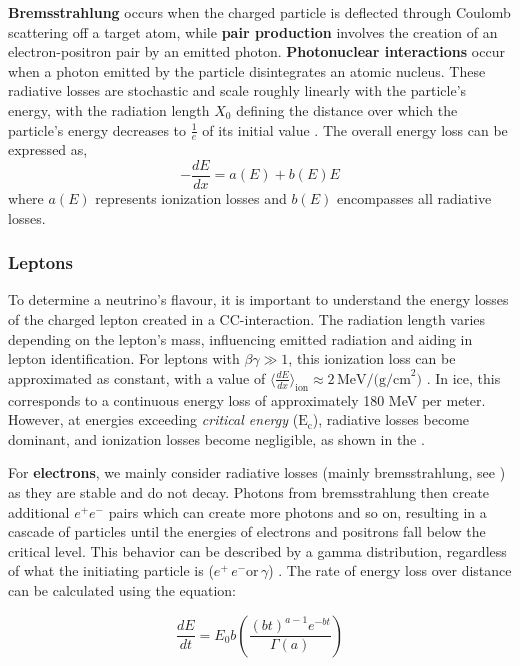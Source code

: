 \textbf{Bremsstrahlung} occurs when the charged particle is deflected through Coulomb scattering off a target atom, while \textbf{pair production} involves the creation of an electron-positron pair by an emitted photon. \textbf{Photonuclear interactions} occur when a photon emitted by the particle disintegrates an atomic nucleus. These radiative losses are stochastic and scale roughly linearly with the particle's energy, with the radiation length $ X_0 $ defining the distance over which the particle’s energy decreases to $ \frac{1}{e} $ of its initial value \cite{PDG_2024}. The overall energy loss can be expressed as, 
\begin{equation}\label{eq:1}
    -\frac{dE}{dx} = a(E) + b(E)E 
\end{equation}
where $a(E)$ represents ionization losses and $b(E)$ encompasses all radiative losses.

\subsubsection{Leptons}
\label{sec:leptons_inice}
To determine a neutrino's flavour, it is important to understand the energy losses of the charged lepton created in a CC-interaction. The radiation length varies depending on the lepton's mass, influencing emitted radiation and aiding in lepton identification. For leptons with $ \beta\gamma \gg 1 $, this ionization loss can be approximated as constant, with a value of $\langle \frac{dE}{dx} \rangle_{\text{ion}} \approx 2 \, \text{MeV/(g/cm}^2)$ . In ice, this corresponds to a continuous energy loss of approximately 180 MeV per meter. However, at energies exceeding \emph{critical energy} ($\mathrm{E}_\mathrm{c}$), radiative losses become dominant, and ionization losses become negligible, as shown in the  . 

For \textbf{electrons}, we mainly consider radiative losses (mainly bremsstrahlung, see ) as they are stable and do not decay. Photons from bremsstrahlung then create additional $e^+e^-$ pairs which can create more photons and so on, resulting in a cascade of particles until the energies of electrons and positrons fall below the critical level. This behavior can be described by a gamma distribution, regardless of what the initiating particle is ($e^+ \, e^- \mathrm{or} \, \gamma$) \cite{PDG_2024}. The rate of energy loss over distance can be calculated using the equation:

\begin{equation}\label{eq:2}
    \frac{dE}{dt} = E_0 b \left( \frac{(bt)^{a-1} e^{-bt}}{\Gamma(a)} \right)
\end{equation}

